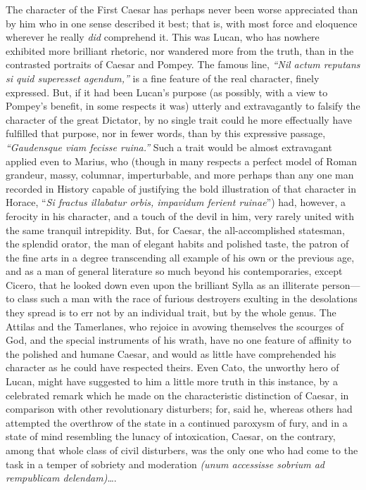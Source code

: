 
The character of the First Caesar has perhaps never been worse
appreciated than by him who in one sense described it best; that is,
with most force and eloquence wherever he really \emph{did} comprehend it.
This was Lucan, who has nowhere exhibited more brilliant rhetoric, nor
wandered more from the truth, than in the contrasted portraits of Caesar
and Pompey. The famous line, \emph{``Nil actum reputans si quid superesset
agendum,''} is a fine feature of the real character, finely expressed.
But, if it had been Lucan's purpose (as possibly, with a view to
Pompey's benefit, in some respects it was) utterly and extravagantly to
falsify the character of the great Dictator, by no single trait could he
more effectually have fulfilled that purpose, nor in fewer words, than
by this expressive passage, \emph{``Gaudensque viam fecisse ruina.''} Such a
trait would be almost extravagant applied even to Marius, who (though in
many respects a perfect model of Roman grandeur, massy, columnar,
imperturbable, and more perhaps than any one man recorded in History
capable of justifying the bold illustration of that character in Horace,
``\emph{Si fractus illabatur orbis, impavidum ferient ruinae}'') had, however,
a ferocity in his character, and a touch of the devil in him, very
rarely united with the same tranquil intrepidity. But, for Caesar, the
all-accomplished statesman, the splendid orator, the man of elegant
habits and polished taste, the patron of the fine arts in a degree
transcending all example of his own or the previous age, and as a man of
general literature so much beyond his contemporaries, except Cicero,
that he looked down even upon the brilliant Sylla as an illiterate
person—to class such a man with the race of furious destroyers exulting
in the desolations they spread is to err not by an individual trait, but
by the whole genus. The Attilas and the Tamerlanes, who rejoice in
avowing themselves the scourges of God, and the special instruments of
his wrath, have no one feature of affinity to the polished and humane
Caesar, and would as little have comprehended his character as he could
have respected theirs. Even Cato, the unworthy hero of Lucan, might have
suggested to him a little more truth in this instance, by a celebrated
remark which he made on the characteristic distinction of Caesar, in
comparison with other revolutionary disturbers; for, said he, whereas
others had attempted the overthrow of the state in a continued paroxysm
of fury, and in a state of mind resembling the lunacy of intoxication,
Caesar, on the contrary, among that whole class of civil disturbers, was
the only one who had come to the task in a temper of sobriety and
moderation \emph{(unum accessisse sobrium ad rempublicam delendam)}….

